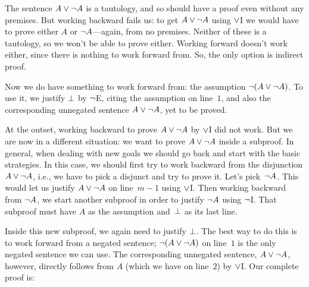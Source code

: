 The sentence $A \vee \neg A$ is a tautology, and so should have a proof even without any premises. But working backward fails us: to get $A \vee \neg A$ using $\vee$I we would have to prove either $A$ or $\neg A$---again, from no premises. Neither of these is a tautology, so we won't be able to prove either. Working forward doesn't work either, since there is nothing to work forward from. So, the only option is indirect proof.
\begin{fitchproof}
	\open
	\ellipsesline
	\close
\end{fitchproof}
Now we do have something to work forward from: the assumption $\neg(A \vee \neg A)$. To use it, we justify $\bot$ by $\neg$E, citing the assumption on line~$1$, and also the corresponding unnegated sentence $A \vee \neg A$, yet to be proved.
\begin{fitchproof}
	\open
	\ellipsesline
	\close
\end{fitchproof}
At the outset, working backward to prove $A \vee\neg A$ by $\vee$I did not work. But we are now in a different situation: we want to prove $A \vee\neg A$ inside a subproof. In general, when dealing with new goals we should go back and start with the basic strategies. In this case, we should first try to work backward from the disjunction $A \vee \neg A$, i.e., we have to pick a disjunct and try to prove it. Let's pick~$\neg A$. This would let us justify $A \vee \neg A$ on line~$m - 1$ using $\vee$I. Then working backward from $\neg A$, we start another subproof in order to justify $\neg A$ using $\neg$I. That subproof must have $A$ as the assumption and~$\bot$ as its last line.
\begin{fitchproof}
	\open
	\open
	\ellipsesline
	\close
	\close
\end{fitchproof}
Inside this new subproof, we again need to justify $\bot$. The best way to do this is to work forward from a negated sentence; $\neg(A \vee \neg A)$ on line~$1$ is the only negated sentence we can use. The corresponding unnegated sentence, $A \vee \neg A$, however, directly follows from $A$ (which we have on line~$2$) by $\vee$I. Our complete proof is:
\begin{fitchproof}
	\open
	\open
	\close
	\close
\end{fitchproof}

